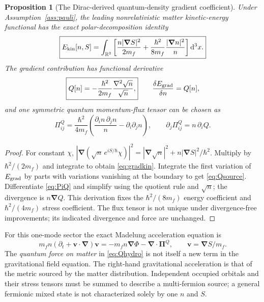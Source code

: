 \documentclass[11pt,a4paper,oneside]{report}
\numberwithin{equation}{chapter}
\newtheorem{proposition}[theorem]{Proposition}
\theoremstyle{definition}\newtheorem{definition}[theorem]{Definition}
\theoremstyle{remark}\newtheorem{remark}[theorem]{Remark}
\newcommand{\dd}{\mathrm d}
\begin{document}
\begin{proposition}[The Dirac-derived quantum-density gradient coefficient]\label{prop:quantumstress}
Under Assumption~\ref{ass:pauli}, the leading nonrelativistic matter kinetic-energy functional has the exact polar-decomposition identity
\begin{equation}
\boxed{\displaystyle
E_{\rm kin}[n,S]=\int_{\mathbb R^3}\left[
 \frac{n|\bm\nabla S|^2}{2m_f}
 +\frac{\hbar^2}{8m_f}\frac{|\bm\nabla n|^2}{n}\right]\dd^3x.}
\label{eq:gradkin}
\end{equation}
The gradient contribution has functional derivative
\begin{equation}
\boxed{Q[n]=-\frac{\hbar^2}{2m_f}\frac{\nabla^2\sqrt n}{\sqrt n},}
\qquad
\frac{\delta E_{\rm grad}}{\delta n}=Q[n],
\label{eq:Qsource}
\end{equation}
and one symmetric quantum momentum-flux tensor can be chosen as
\begin{equation}
\boxed{\displaystyle
\Pi_{ij}^{Q}=\frac{\hbar^2}{4m_f}
\left(\frac{\partial_i n\,\partial_j n}{n}-\partial_i\partial_jn\right),
\qquad \partial_j\Pi_{ij}^{Q}=n\,\partial_iQ.}
\label{eq:PiQ}
\end{equation}
\end{proposition}
\begin{proof}
For constant $\chi$, $|\bm\nabla(\sqrt n\,e^{iS/\hbar}\chi)|^2=|\bm\nabla\sqrt n|^2+n|\bm\nabla S|^2/\hbar^2$. Multiply by $\hbar^2/(2m_f)$ and integrate to obtain \eqref{eq:gradkin}. Integrate the first variation of $E_{\rm grad}$ by parts with variations vanishing at the boundary to get \eqref{eq:Qsource}. Differentiate \eqref{eq:PiQ} and simplify using the quotient rule and $\sqrt n$; the divergence is $n\bm\nabla Q$. This derivation fixes the $\hbar^2/(8m_f)$ energy coefficient and $\hbar^2/(4m_f)$ stress coefficient. The flux tensor is not unique under divergence-free improvements; its indicated divergence and force are unchanged.
\end{proof}

For this one-mode sector the exact Madelung acceleration equation is
\begin{equation}
 m_fn(\partial_t+\bm v\cdot\bm\nabla)\bm v
 =-m_fn\bm\nabla\Phi-\bm\nabla\cdot\bm\Pi^Q,
 \qquad \bm v=\bm\nabla S/m_f.
 \label{eq:Qhydro}
\end{equation}
The \emph{quantum force on matter} in \eqref{eq:Qhydro} is not itself a new term in the gravitational field equation. The right-hand gravitational acceleration is that of the metric sourced by the matter distribution. Independent occupied orbitals and their stress tensors must be summed to describe a multi-fermion source; a general fermionic mixed state is not characterized solely by one $n$ and $S$.
\end{document}
